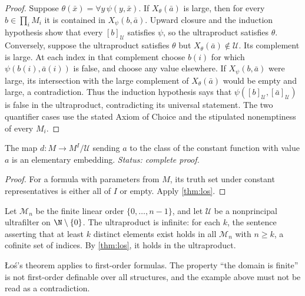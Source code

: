 \begin{proof}
Suppose \(\theta(\bar x)=\forall y\,\psi(y,\bar x)\).  If
\(X_\theta(\bar a)\) is large, then for every \(b\in\prod_iM_i\) it is
contained in \(X_\psi(b,\bar a)\).  Upward closure and the induction
hypothesis show that every \([b]_{\mathcal U}\) satisfies \(\psi\), so the
ultraproduct satisfies \(\theta\).  Conversely, suppose the ultraproduct
satisfies \(\theta\) but \(X_\theta(\bar a)\notin\mathcal U\).  Its complement
is large.  At each index in that complement choose \(b(i)\) for which
\(\psi(b(i),\bar a(i))\) is false, and choose any value elsewhere.  If
\(X_\psi(b,\bar a)\) were large, its intersection with the large complement
of \(X_\theta(\bar a)\) would be empty and large, a contradiction.  Thus the
induction hypothesis says that \(\psi([b]_{\mathcal U},[\bar a]_{\mathcal U})\)
is false in the ultraproduct, contradicting its universal statement.  The two
quantifier cases use the stated Axiom of Choice and the stipulated
nonemptiness of every \(M_i\).
\end{proof}

\begin{corollary}
\label{cor:diagonal-ultrapower}
The map \(d:M\to M^I/\mathcal U\) sending \(a\) to the class of the constant
function with value \(a\) is an elementary embedding.
\textit{Status: complete proof.}
\end{corollary}

\begin{proof}
For a formula with parameters from \(M\), its truth set under constant
representatives is either all of \(I\) or empty.  Apply
\cref{thm:los}.
\end{proof}

\begin{example}
Let \(\mathcal M_n\) be the finite linear order
\(\{0,\ldots,n-1\}\), and let \(\mathcal U\) be a nonprincipal ultrafilter on
\(\N\setminus\{0\}\).  The ultraproduct is infinite: for each \(k\), the
sentence asserting that at least \(k\) distinct elements exist holds in all
\(\mathcal M_n\) with \(n\geq k\), a cofinite set of indices.  By
\cref{thm:los}, it holds in the ultraproduct.
\end{example}

\begin{warning}
\L o\'s's theorem applies to first-order formulas.  The property ``the domain
is finite'' is not first-order definable over all structures, and the example
above must not be read as a contradiction.
\end{warning}


